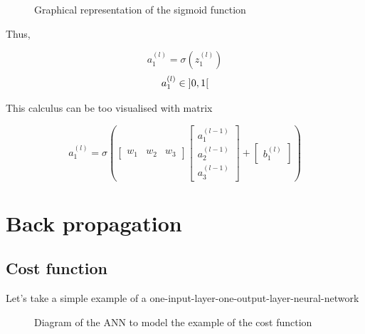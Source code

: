 \documentclass[]{report}
\begin{document}
\begin{figure}[H]
    \centering
    \caption{Graphical representation of the sigmoid function}
\end{figure}

{Thus,}

\[a^{(l)}_1=\sigma\left(z^{(l)}_1\right)\]
\[a^{(l)}_1 \in \interval[open]{0}{1}\]

{This calculus can be too visualised with matrix}

\[a^{(l)}_1=\sigma\left(\begin{bmatrix}w_1 & w_2 & w_3\end{bmatrix}\begin{bmatrix}a^{(l-1)}_1 \\ a^{(l-1)}_2 \\ a^{(l-1)}_3\end{bmatrix}+\begin{bmatrix}b^{(l)}_1\end{bmatrix}\right)\]

\section{Back propagation}

\subsection{Cost function}

{Let's take a simple example of a one-input-layer-one-output-layer-neural-network}

\begin{figure}[H]
    \centering
    \begin{neuralnetwork}[height=2, nodespacing=15mm]
        \newcommand{\inputtext}[2]{$a^{(l-1)}$}
        \newcommand{\outputtext}[2]{$a^{(l)}$}
        \inputlayer[count=1, bias=false, text=\inputtext, title=Input layer]
        \outputlayer[count=1,  text=\outputtext, title=Output layer]
        \linklayers[title=Weight $w$]
    \end{neuralnetwork}
    \caption{Diagram of the ANN to model the example of the cost function}
    \label{fig:simplenn}
\end{figure}
\end{document}
